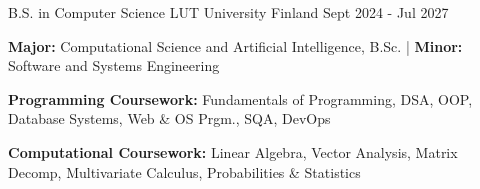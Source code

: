 

\begin{cventries}

  \vspace{-0.3mm}
  \cventryalt
    {B.S. in Computer Science} %
    {LUT University} %
    {Finland} %
    {Sept 2024 - Jul 2027} %
    {
      \begin{cvitems} %
        \item {\textbf{Major:} Computational Science and Artificial Intelligence, B.Sc. | \textbf{Minor:} Software and Systems Engineering}
        \item {\textbf{Programming Coursework:} Fundamentals of Programming, DSA, OOP, Database Systems, Web \& OS Prgm., SQA, DevOps}
        \item {\textbf{Computational Coursework:} Linear Algebra, Vector Analysis, Matrix Decomp, Multivariate Calculus, Probabilities \& Statistics}
      \end{cvitems}
    }
\end{cventries}
\vspace{-3.0mm}